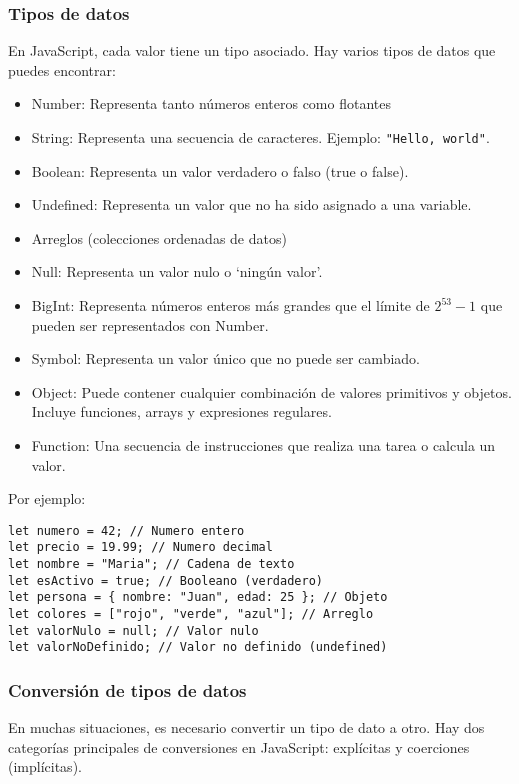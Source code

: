 \documentclass[executivepaper]{article}
\begin{document}
\subsubsection*{Tipos de datos}
En JavaScript, cada valor tiene un tipo asociado. Hay varios tipos de datos que puedes encontrar:
\begin{itemize}
  \item Number: Representa tanto números enteros como flotantes
  \item String: Representa una secuencia de caracteres. Ejemplo: \lstinline{"Hello, world"}.
  \item Boolean: Representa un valor verdadero o falso (true o false).
  \item Undefined: Representa un valor que no ha sido asignado a una variable.
  \item Arreglos (colecciones ordenadas de datos)
  \item Null: Representa un valor nulo o \enquote*{ningún valor}.
  \item BigInt: Representa números enteros más grandes que el límite de $2^53 - 1$ que pueden ser representados con Number.
  \item Symbol: Representa un valor único que no puede ser cambiado.
  \item Object: Puede contener cualquier combinación de valores primitivos y objetos. Incluye funciones, arrays y expresiones regulares.
  \item Function: Una secuencia de instrucciones que realiza una tarea o calcula un valor.
\end{itemize}

Por ejemplo:
\begin{lstlisting}
let numero = 42; // Numero entero
let precio = 19.99; // Numero decimal
let nombre = "Maria"; // Cadena de texto
let esActivo = true; // Booleano (verdadero)
let persona = { nombre: "Juan", edad: 25 }; // Objeto
let colores = ["rojo", "verde", "azul"]; // Arreglo
let valorNulo = null; // Valor nulo
let valorNoDefinido; // Valor no definido (undefined)
\end{lstlisting}

\subsubsection*{Conversión de tipos de datos}
En muchas situaciones, es necesario convertir un tipo de dato a otro. Hay dos categorías principales de conversiones en JavaScript: explícitas y coerciones (implícitas).
\end{document}
